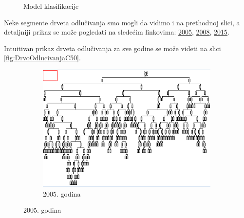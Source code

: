 \documentclass[a4paper]{article}
\begin{document}
\begin{figure}[H]
	\caption{Model klasifikacije}
	\label{fig:ModelKlasifikacijaC50}
\end{figure}

Neke segmente drveta odlučivanja smo mogli da vidimo i na prethodnoj slici, a detaljniji prikaz se može pogledati na sledećim linkovima: \href{file:./Klasifikacija/C50/Model_Surface2005.html}{2005}, \href{file:./Klasifikacija/C50/Model_Surface2008.html}{2008}, \href{file:./Klasifikacija/C50/Model_Surface2015.html}{2015}. 

Intuitivan prikaz drveta odlučivanja za sve godine se može videti na slici \ref{fig:DrvoOdlucivanjaC50}.

\begin{figure}[H]
	\begin{subfigure}[h]{\textwidth}
		\begin{center}
			\includegraphics[scale=0.70]{Klasifikacija/C50/MapaDrvetaOdlucivanja2005.png}
		\end{center}
		\caption{2005. godina}
		\label{fig:DrvoOdlucivanjaC502005}
	\end{subfigure}


\end{figure}
\end{document}
